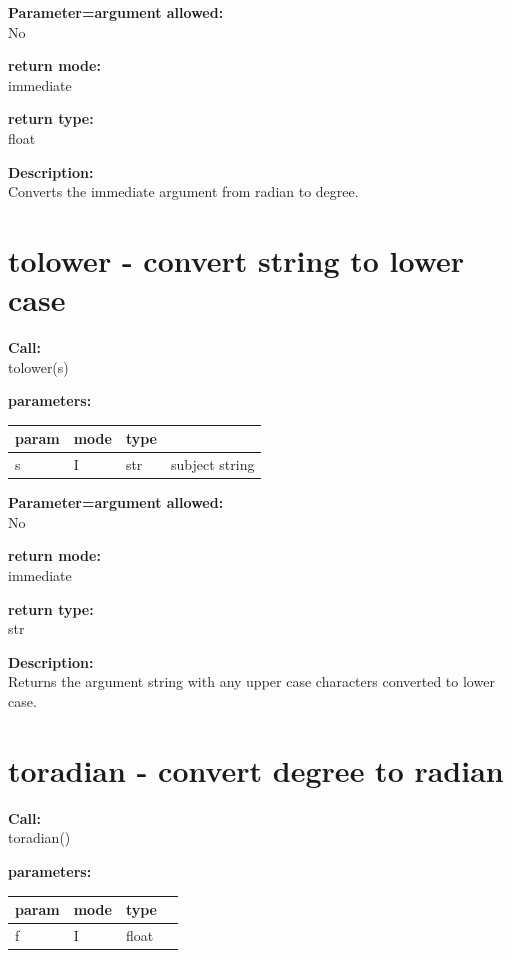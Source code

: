         {\bf Parameter=argument allowed:} \\
        No
        
        {\bf return mode:} \\
        immediate

        {\bf return type:} \\
        float
        
        {\bf Description:} \\
        Converts the immediate argument from radian to degree.


    \section{tolower - convert string to lower case}\label{sec:iftolower}
        
        {\bf Call:} \\
        tolower(s)
        
        {\bf parameters:} \\
        \begin{tabular}{| l | l | l | l |}
        \hline
        param  & mode & type & \\
        \hline \hline
        s & I & str & subject string   \\ \hline
        \end{tabular}
        
        {\bf Parameter=argument allowed:} \\
        No
        
        {\bf return mode:} \\
        immediate

        {\bf return type:} \\
        str
        
        {\bf Description:} \\
        Returns the argument string with any upper case characters converted
        to lower case.


    \section{toradian - convert degree to radian}\label{sec:iftoradian}
            
        {\bf Call:} \\
        toradian()
        
        {\bf parameters:} \\
        \begin{tabular}{| l | l | l | l |}
        \hline
        param  & mode & type & \\
        \hline \hline
        f & I & float & \\ \hline
        \end{tabular}
        
